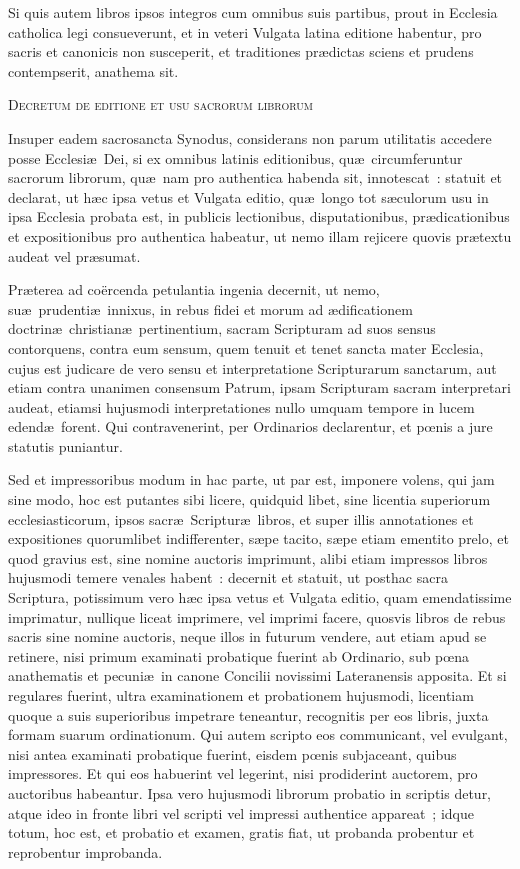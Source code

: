 Si quis autem libros ipsos integros cum omnibus suis partibus, prout in 
Ecclesia catholica legi consueverunt, et in veteri Vulgata latina editione 
habentur, pro sacris et canonicis non susceperit, et traditiones pr\ae dictas 
sciens et prudens contempserit, anathema sit.\enlargethispage{2\baselineskip}

\newpage%
\begin{center}
\textsc{Decretum de editione et usu sacrorum librorum}
\end{center}
\noindent Insuper eadem sacrosancta Synodus, considerans non parum utilitatis 
accedere posse Ecclesi\ae\ Dei, si ex omnibus latinis editionibus, qu\ae\ 
circumferuntur sacrorum librorum, qu\ae\ nam pro authentica habenda sit, 
innotescat~: statuit et declarat, ut h\ae c ipsa vetus et Vulgata editio, 
qu\ae\ longo tot s\ae culorum usu in ipsa Ecclesia probata est, in 
publicis lectionibus, disputationibus, pr\ae dicationibus et expositionibus 
pro authentica habeatur, ut nemo illam rejicere quovis pr\ae textu audeat vel 
pr\ae sumat. 

Pr\ae terea ad co\"ercenda petulantia ingenia decernit, ut nemo, su\ae\ 
prudenti\ae\ innixus, in rebus fidei et morum ad \ae dificationem doctrin\ae\ 
christian\ae\ pertinentium, sacram Scripturam ad suos sensus contorquens, 
contra eum sensum, quem tenuit et tenet sancta mater Ecclesia, cujus est 
judicare de vero sensu et interpretatione Scripturarum sanctarum, aut etiam 
contra unanimen consensum Patrum, ipsam Scripturam sacram interpretari audeat, 
etiamsi hujusmodi interpretationes nullo umquam tempore in lucem edend\ae\ 
forent.
Qui contravenerint, per Ordinarios declarentur, et p\oe nis a jure 
statutis puniantur. 

Sed et impressoribus modum in hac parte, ut par est, imponere volens, qui jam 
sine modo, hoc est putantes sibi licere, quidquid libet, sine licentia 
superiorum ecclesiasticorum, ipsos sacr\ae\ Scriptur\ae\ libros, et super 
illis 
annotationes et expositiones quorumlibet indifferenter, s\ae pe tacito, 
s\ae pe etiam ementito prelo, et quod gravius est, sine nomine auctoris 
imprimunt, alibi etiam impressos libros hujusmodi temere venales habent~: 
decernit et statuit, ut posthac sacra Scriptura, potissimum vero h\ae c ipsa 
vetus et Vulgata editio, quam emendatissime imprimatur, nullique liceat 
imprimere, vel imprimi facere, quosvis libros de rebus sacris sine nomine 
auctoris, neque illos in futurum vendere, aut etiam apud se retinere, nisi 
primum examinati probatique fuerint ab Ordinario, sub p\oe na anathematis et 
pecuni\ae\ in canone Concilii novissimi Lateranensis apposita. Et si 
regulares fuerint, ultra examinationem et probationem hujusmodi, licentiam 
quoque a suis superioribus impetrare teneantur, recognitis per eos libris, 
juxta formam suarum ordinationum. Qui autem scripto eos communicant, vel 
evulgant, nisi antea examinati probatique fuerint, eisdem p\oe nis subjaceant, 
quibus impressores. Et qui eos habuerint vel legerint, nisi prodiderint 
auctorem, pro auctoribus habeantur. Ipsa vero hujusmodi librorum probatio in 
scriptis detur, atque ideo in fronte libri vel scripti vel impressi authentice 
appareat~; idque totum, hoc est, et probatio et examen, gratis fiat, ut 
probanda 
probentur et reprobentur improbanda. 

